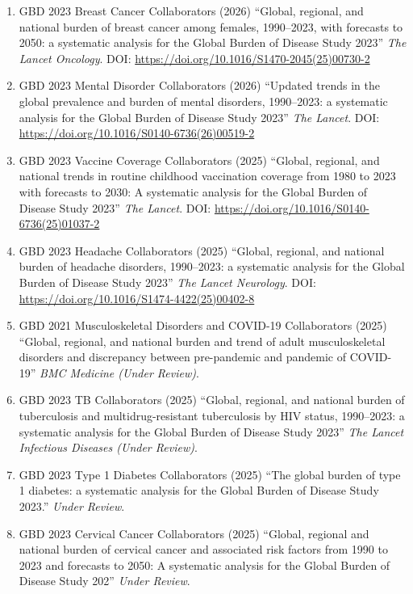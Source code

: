 \documentclass[
  11pt,
  letterpaper,
  DIV=11,
  numbers=noendperiod]{scrartcl}
\providecommand{\tightlist}{%
  \setlength{\itemsep}{0pt}\setlength{\parskip}{0pt}}
\begin{document}
\begin{enumerate}
\def\labelenumi{\arabic{enumi}.}
\tightlist
\item
  GBD 2023 Breast Cancer Collaborators (2026) ``Global, regional, and
  national burden of breast cancer among females, 1990--2023, with
  forecasts to 2050: a systematic analysis for the Global Burden of
  Disease Study 2023'' \emph{The Lancet Oncology}. DOI:
  \href{https://doi.org/https://doi.org/10.1016/S1470-2045(25)00730-2}{https://doi.org/10.1016/S1470-2045(25)00730-2}
\item
  GBD 2023 Mental Disorder Collaborators (2026) ``Updated trends in the
  global prevalence and burden of mental disorders, 1990--2023: a
  systematic analysis for the Global Burden of Disease Study 2023''
  \emph{The Lancet}. DOI:
  \href{https://doi.org/https://doi.org/10.1016/S0140-6736(26)00519-2}{https://doi.org/10.1016/S0140-6736(26)00519-2}
\item
  GBD 2023 Vaccine Coverage Collaborators (2025) ``Global, regional, and
  national trends in routine childhood vaccination coverage from 1980 to
  2023 with forecasts to 2030: A systematic analysis for the Global
  Burden of Disease Study 2023'' \emph{The Lancet}. DOI:
  \href{https://doi.org/https://doi.org/10.1016/S0140-6736(25)01037-2}{https://doi.org/10.1016/S0140-6736(25)01037-2}
\item
  GBD 2023 Headache Collaborators (2025) ``Global, regional, and
  national burden of headache disorders, 1990--2023: a systematic
  analysis for the Global Burden of Disease Study 2023'' \emph{The
  Lancet Neurology}. DOI:
  \href{https://doi.org/https://doi.org/10.1016/S1474-4422(25)00402-8}{https://doi.org/10.1016/S1474-4422(25)00402-8}
\item
  GBD 2021 Musculoskeletal Disorders and COVID-19 Collaborators (2025)
  ``Global, regional, and national burden and trend of adult
  musculoskeletal disorders and discrepancy between pre-pandemic and
  pandemic of COVID-19'' \emph{BMC Medicine (Under Review)}.\\
\item
  GBD 2023 TB Collaborators (2025) ``Global, regional, and national
  burden of tuberculosis and multidrug-resistant tuberculosis by HIV
  status, 1990--2023: a systematic analysis for the Global Burden of
  Disease Study 2023'' \emph{The Lancet Infectious Diseases (Under
  Review)}.\\
\item
  GBD 2023 Type 1 Diabetes Collaborators (2025) ``The global burden of
  type 1 diabetes: a systematic analysis for the Global Burden of
  Disease Study 2023.'' \emph{Under Review}.\\
\item
  GBD 2023 Cervical Cancer Collaborators (2025) ``Global, regional and
  national burden of cervical cancer and associated risk factors from
  1990 to 2023 and forecasts to 2050: A systematic analysis for the
  Global Burden of Disease Study 202'' \emph{Under Review}.
\end{enumerate}
\end{document}
